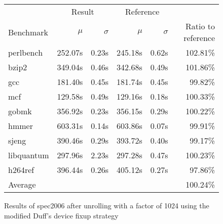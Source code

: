 \begin{figure}[h]
    \begin{center}
        \begin{tabular}{lrrrrr}
            \toprule
            & \multicolumn{2}{c}{Result} & \multicolumn{2}{c}{Reference}\\
            Benchmark & $\mu$ & $\sigma$ & $\mu$ & $\sigma$ & Ratio to reference\\
            \midrule
            perlbench & 252.07s & 0.23s & 245.18s & 0.62s & 102.81\%\\
            bzip2 & 349.04s & 0.46s & 342.68s & 0.49s & 101.86\%\\
            gcc & 181.40s & 0.45s & 181.74s & 0.45s & 99.82\%\\
            mcf & 129.58s & 0.49s & 129.16s & 0.18s & 100.33\%\\
            gobmk & 356.92s & 0.23s & 356.15s & 0.29s & 100.22\%\\
            hmmer & 603.31s & 0.14s & 603.86s & 0.07s & 99.91\%\\
            sjeng & 390.46s & 0.29s & 393.72s & 0.40s & 99.17\%\\
            libquantum & 297.96s & 2.23s & 297.28s & 0.47s & 100.23\%\\
            h264ref & 396.44s & 0.26s & 405.12s & 0.27s & 97.86\%\\
            \midrule
            Average & & & & & 100.24\%\\
            \bottomrule
        \end{tabular}
    \end{center}
    \caption{Results of spec2006 after unrolling with a factor of 1024 using the modified Duff's device fixup strategy}
    \label{fig:eval:perf:duff:1024}
\end{figure}